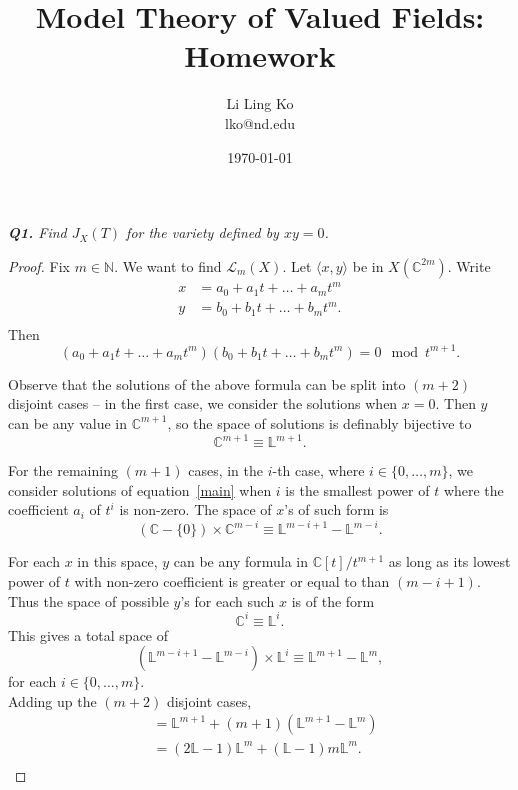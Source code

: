 \documentclass{article}
\begin{document}
\title{Model Theory of Valued Fields: Homework}
\author{Li Ling Ko\\ lko@nd.edu}
\date{\today}
\maketitle

\it \textbf{Q1.} Find $J_X(T)$ for the variety defined by $xy=0$.
\begin{proof}
  Fix $m\in\mathbb{N}$. We want to find $\mathcal{L}_m(X)$. Let $\langle x,
  y\rangle$ be in $X(\mathbb{C}^{2m})$. Write
  \begin{align*}
    x &=a_0+a_1t+\ldots+a_mt^m\\
    y &=b_0+b_1t+\ldots+b_mt^m.\\
  \end{align*}
  Then
  \begin{equation}
    \label{main}
    (a_0+a_1t+\ldots+a_mt^m) (b_0+b_1t+\ldots+b_mt^m)=0 \mod t^{m+1}.
  \end{equation}

  Observe that the solutions of the above formula can be split into $(m+2)$
  disjoint cases -- in the first case, we consider the solutions when
  $x=0$. Then $y$ can be any value in $\mathbb{C}^{m+1}$, so the space of
  solutions is definably bijective to 
  \[\mathbb{C}^{m+1} \equiv \mathbb{L}^{m+1}.\]

  For the remaining $(m+1)$ cases, in the $i$-th case, where
  $i\in\{0,\ldots,m\}$, we consider solutions of equation~\eqref{main} when
  $i$ is the smallest power of $t$ where the coefficient $a_i$ of $t^i$ is
  non-zero. The space of $x$'s of such form is
  \[(\mathbb{C}-\{0\}) \times\mathbb{C}^{m-i} \equiv
  \mathbb{L}^{m-i+1}-\mathbb{L}^{m-i}.\]

  For each $x$ in this space, $y$ can be any formula in
  $\mathbb{C}[t]/t^{m+1}$ as long as its lowest power of $t$ with non-zero
  coefficient is greater or equal to than $(m-i+1)$. Thus the space of
  possible $y$'s for each such $x$ is of the form
  \[\mathbb{C}^{i} \equiv \mathbb{L}^{i}.\]
  This gives a total space of
  \[(\mathbb{L}^{m-i+1}-\mathbb{L}^{m-i}) \times\mathbb{L}^{i} \equiv
  \mathbb{L}^{m+1}-\mathbb{L}^{m},\]
  for each $i\in\{0,\ldots,m\}$. \\

  Adding up the $(m+2)$ disjoint cases,
  \begin{align*}
    [\mathcal{L}_m(X)] &=\mathbb{L}^{m+1}
      +(m+1)(\mathbb{L}^{m+1}-\mathbb{L}^{m})\\
      &=(2\mathbb{L}-1)\mathbb{L}^m +(\mathbb{L}-1)m\mathbb{L}^m.\\
  \end{align*}


\end{proof}
\end{document}
